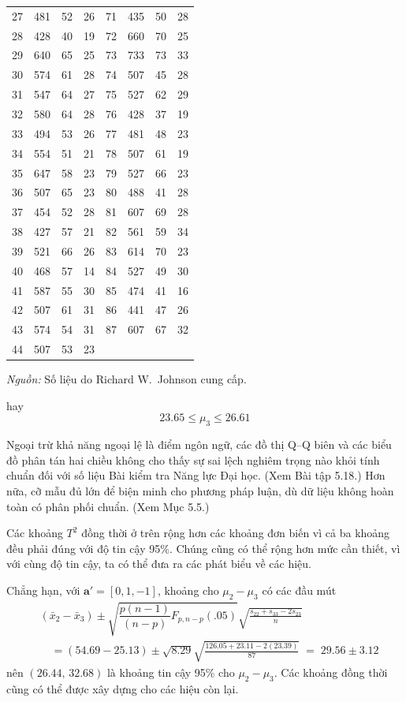 \begin{center}
\begin{minipage}{\linewidth}
\begin{tabular}{cccc@{\hspace{14pt}}cccc}
27&481&52&26&71&435&50&28\\
28&428&40&19&72&660&70&25\\
29&640&65&25&73&733&73&33\\
30&574&61&28&74&507&45&28\\
31&547&64&27&75&527&62&29\\
32&580&64&28&76&428&37&19\\
33&494&53&26&77&481&48&23\\
34&554&51&21&78&507&61&19\\
35&647&58&23&79&527&66&23\\
36&507&65&23&80&488&41&28\\
37&454&52&28&81&607&69&28\\
38&427&57&21&82&561&59&34\\
39&521&66&26&83&614&70&23\\
40&468&57&14&84&527&49&30\\
41&587&55&30&85&474&41&16\\
42&507&61&31&86&441&47&26\\
43&574&54&31&87&607&67&32\\
44&507&53&23& & & & \\
\hline
\end{tabular}
 
\smallskip
\noindent\textit{Nguồn:} Số liệu do Richard W.\ Johnson cung cấp.
\end{minipage}
\end{center}
 
\noindent hay
\[
  23.65\le\mu_3\le26.61
\]
 
 
 
Ngoại trừ khả năng ngoại lệ là điểm ngôn ngữ, các đồ thị Q--Q biên và các biểu đồ phân tán hai chiều không cho thấy sự sai lệch nghiêm trọng nào khỏi tính chuẩn đối với số liệu Bài kiểm tra Năng lực Đại học. (Xem Bài tập 5.18.) Hơn nữa, cỡ mẫu đủ lớn để biện minh cho phương pháp luận, dù dữ liệu không hoàn toàn có phân phối chuẩn. (Xem Mục 5.5.)
 
Các khoảng $T^2$ đồng thời ở trên rộng hơn các khoảng đơn biến vì cả ba khoảng đều phải đúng với độ tin cậy 95\%. Chúng cũng có thể rộng hơn mức cần thiết, vì với cùng độ tin cậy, ta có thể đưa ra các phát biểu về các hiệu.
 
Chẳng hạn, với $\mathbf{a}'=[0,1,-1]$, khoảng cho $\mu_2-\mu_3$ có các đầu mút
\begin{align*}
  &(\bar{x}_2-\bar{x}_3)\pm\sqrt{\dfrac{p(n-1)}{(n-p)}F_{p,n-p}(.05)}\sqrt{\frac{s_{22}+s_{33}-2s_{23}}{n}}\\
  &\quad=(54.69-25.13)\pm\sqrt{8.29}\sqrt{\frac{126.05+23.11-2(23.39)}{87}}
   \;=\;29.56\pm3.12
\end{align*}
nên $(26.44,\,32.68)$ là khoảng tin cậy 95\% cho $\mu_2-\mu_3$. Các khoảng đồng thời cũng có thể được xây dựng cho các hiệu còn lại.
 
